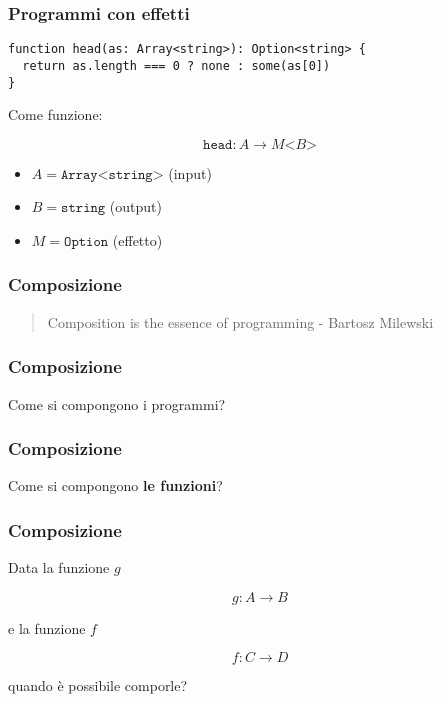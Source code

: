 \documentclass{beamer}
\begin{document}
\begin{frame}[fragile]
\frametitle{Programmi con effetti}

\begin{example}
\begin{verbatim}
function head(as: Array<string>): Option<string> {
  return as.length === 0 ? none : some(as[0])
}
\end{verbatim}
\end{example}

Come funzione:

$$
\texttt{head}: A \rightarrow M \texttt{<} B \texttt{>}
$$

\begin{itemize}
  \item $A = \texttt{Array<string>}$ (input)
  \item $B = \texttt{string}$ (output)
  \item $M = \texttt{Option}$ (effetto)
\end{itemize}

\end{frame}

\begin{frame}
\frametitle{Composizione}

\begin{quote}
Composition is the essence of programming - Bartosz Milewski
\end{quote}

\end{frame}

\begin{frame}
\frametitle{Composizione}

\centerline{Come si compongono i programmi?}

\end{frame}

\begin{frame}
\frametitle{Composizione}

\centerline{Come si compongono  \textbf{le funzioni}?}

\end{frame}

\begin{frame}
\frametitle{Composizione}

Data la funzione $g$

$$
g: A \rightarrow B
$$

e la funzione $f$

$$
f: C \rightarrow D
$$

quando è possibile comporle?

\end{frame}
\end{document}
